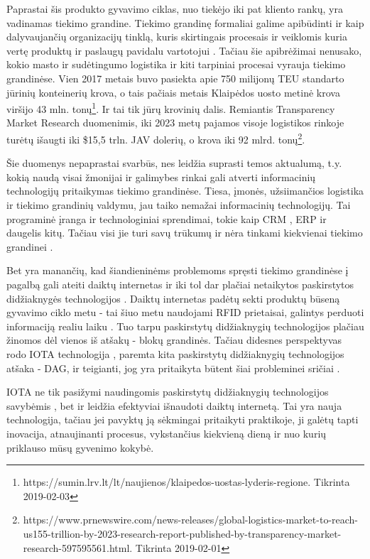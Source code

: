 Paprastai šis produkto gyvavimo ciklas, nuo tiekėjo iki pat kliento rankų, yra vadinamas tiekimo grandine. Tiekimo grandinę formaliai galime apibūdinti ir kaip dalyvaujančių organizacijų tinklą, kuris skirtingais procesais ir veiklomis kuria vertę produktų ir paslaugų pavidalu vartotojui \cite{christopher2016logistics}. Tačiau šie apibrėžimai nenusako, kokio masto ir sudėtingumo logistika ir kiti tarpiniai procesai vyrauja tiekimo grandinėse. Vien 2017 metais buvo pasiekta apie 750 milijonų TEU standarto jūrinių konteinerių krova\footnotemark[\ref{note1}], o tais pačiais metais Klaipėdos uosto metinė krova viršijo 43 mln. tonų\footnote{https://sumin.lrv.lt/lt/naujienos/klaipedos-uostas-lyderis-regione. Tikrinta 2019-02-03}. Ir tai tik jūrų krovinių dalis. Remiantis Transparency Market Research duomenimis, iki 2023 metų pajamos visoje logistikos rinkoje turėtų išaugti iki \$15,5 trln. JAV dolerių, o krova iki 92 mlrd. tonų\footnote{https://www.prnewswire.com/news-releases/global-logistics-market-to-reach-us155-trillion-by-2023-research-report-published-by-transparency-market-research-597595561.html. Tikrinta 2019-02-01}.

Šie duomenys nepaprastai svarbūs, nes leidžia suprasti temos aktualumą, t.y. kokią naudą visai žmonijai ir galimybes rinkai gali atverti informacinių technologijų pritaikymas tiekimo grandinėse. Tiesa, įmonės, užsiimančios logistika ir tiekimo grandinių valdymu, jau taiko nemažai informacinių technologijų. Tai programinė įranga ir technologiniai sprendimai, tokie kaip CRM \cite{bharati2015current}, ERP \cite{neubert2018collaboration} ir daugelis kitų. Tačiau visi jie turi savų trūkumų ir nėra tinkami kiekvienai tiekimo grandinei \cite{garg2018supply}.

Bet yra manančių, kad šiandieninėms problemoms spręsti tiekimo grandinėse į pagalbą gali ateiti daiktų internetas \cite{dweekat2017supply} ir iki tol dar plačiai netaikytos paskirstytos didžiaknygės technologijos \cite{abeyratne2016blockchain}. Daiktų internetas padėtų sekti produktų būseną gyvavimo ciklo metu - tai šiuo metu naudojami RFID prietaisai, galintys perduoti informaciją realiu laiku \cite{majeed2017internet}. Tuo tarpu paskirstytų didžiaknygių technologijos plačiau žinomos dėl vienos iš atšakų - blokų grandinės. Tačiau didesnes perspektyvas rodo IOTA technologija \cite{popov2016tangle}, paremta kita paskirstytų didžiaknygių technologijos atšaka - DAG, ir teigianti, jog yra pritaikyta būtent šiai probleminei sričiai . 

IOTA ne tik pasižymi naudingomis paskirstytų didžiaknygių technologijos savybėmis \cite{bramas2018stability}, bet ir leidžia efektyviai išnaudoti daiktų internetą. Tai yra nauja technologija, tačiau jei pavyktų ją sėkmingai pritaikyti praktikoje, ji galėtų tapti inovacija, atnaujinanti procesus, vykstančius kiekvieną dieną ir nuo kurių priklauso mūsų gyvenimo kokybė.

